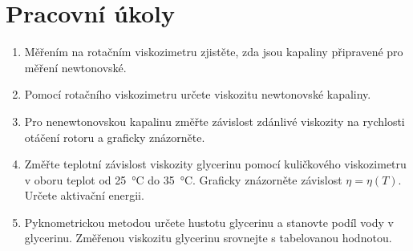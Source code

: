 \documentclass[a4paper]{article}
\author{Vladislav Wohlrath}
\begin{document}
\begin{titlepage}

\end{titlepage}

\section*{Pracovní úkoly}
\begin{enumerate}
\item Měřením na rotačním viskozimetru zjistěte, zda jsou kapaliny připravené pro měření newtonovské.
\item Pomocí rotačního viskozimetru určete viskozitu newtonovské kapaliny.
\item Pro nenewtonovskou kapalinu změřte závislost zdánlivé viskozity na rychlosti otáčení rotoru a graficky znázorněte.
\item Změřte teplotní závislost viskozity glycerinu pomocí kuličkového viskozimetru v oboru teplot od \SI{25}{\degreeCelsius} do \SI{35}{\degreeCelsius}. Graficky znázorněte závislost $\eta = \eta(T)$. Určete aktivační energii.
\item Pyknometrickou metodou určete hustotu glycerinu a stanovte podíl vody v glycerinu. Změřenou viskozitu glycerinu srovnejte s tabelovanou hodnotou. 
\end{enumerate}












\printbibliography[title={Seznam použité literatury}]
\end{document}
